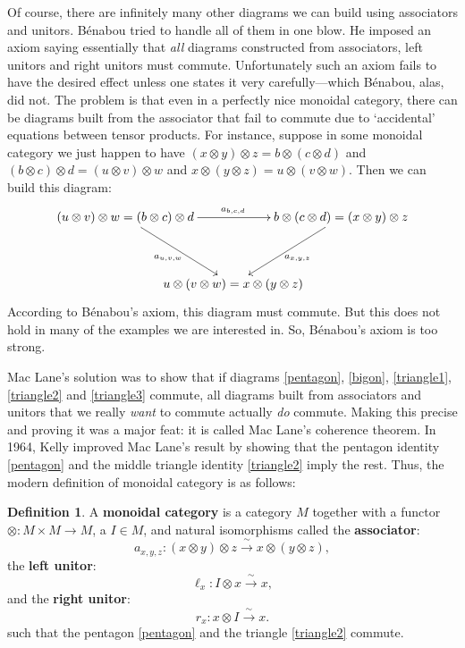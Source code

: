 \documentclass[reqno]{amsart}
\newcommand{\maps}{\colon}    %
\newcommand{\define}[1]{\textbf{\boldmath{#1}}}
\theoremstyle{definition}
\newtheorem{defn}[thm]{Definition}
\begin{document}
Of course, there are infinitely many other diagrams we can build using associators and unitors.   B\'enabou tried to handle all of them in one blow.   He imposed an axiom saying essentially that \emph{all} diagrams constructed from associators, left unitors and right unitors must commute.   Unfortunately such an axiom fails to have the desired effect unless one states it very carefully---which B\'enabou, alas, did not.  The problem is that even in a perfectly nice monoidal category, there can be diagrams built from the associator that fail to commute due to `accidental' equations between tensor products.  For instance, suppose in some monoidal category we just happen to have $(x\otimes y)\otimes z = b \otimes (c \otimes d) $ and $(b \otimes c) \otimes d = (u \otimes v) \otimes w$ and $x\otimes (y\otimes z) = u \otimes (v\otimes w)$.  Then we can build this diagram:
\[
\xy 0;/r.3pc/:
(-24,15)*+{(u \otimes v) \otimes w = (b \otimes c) \otimes d}="l";
(24,15)*+{b \otimes (c \otimes d) = (x \otimes y) \otimes z}="r";
(0,0)*+{u \otimes (v \otimes w) = x \otimes (y \otimes z)}="b";
 {\ar^{a_{b,c,d}} "l";"r"};
{\ar_{a_{u,v,w}} "l";"b"};
{\ar^{a_{x,y,z}} "r";"b"};
\endxy    
\]
According to B\'enabou's axiom, this diagram must commute.  But this does not hold in many of the examples we are interested in.   So, B\'enabou's axiom is too strong.

Mac Lane's solution \cite{M63} was to show that if diagrams \eqref{pentagon}, \eqref{bigon}, \eqref{triangle1}, \eqref{triangle2} and \eqref{triangle3} commute, all diagrams built from associators and unitors that we really \emph{want} to commute actually \emph{do} commute.  Making this precise and proving it was a major feat: it is called Mac Lane's coherence theorem.   In 1964, Kelly \cite{K64} improved Mac Lane's result by showing that the pentagon identity \eqref{pentagon} and the middle triangle identity \eqref{triangle2} imply the rest.   Thus, the modern definition of monoidal category is as follows:

\begin{defn}
 A \textbf{monoidal category} is a category $M$ together with a \define{tensor
product} functor $\otimes \maps M \times M \to M$, a \define{unit object}
$I \in M$, and natural isomorphisms
called the \textbf{associator}:
\[ a_{x,y,z} \maps (x \otimes y) \otimes z \xrightarrow{\; \sim \;} x \otimes (y \otimes z), \]
the \textbf{left unitor}:
\[ \ell_x \maps I \otimes x \xrightarrow{\; \sim \;} x , \]
and the \textbf{right unitor}:
\[ r_x \maps x \otimes I \xrightarrow{\; \sim \;} x. \]
such that the pentagon \eqref{pentagon} and the triangle \eqref{triangle2} commute.
\end{defn}
\end{document}
